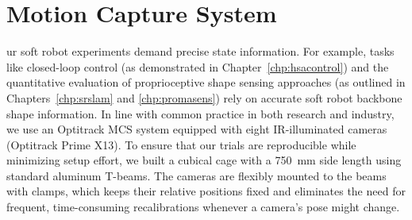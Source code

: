 \section{Motion Capture System}\label{sec:apx:infrastructure:motion_capture_system}
ur soft robot experiments demand precise state information. For example, tasks like closed-loop control (as demonstrated in Chapter~\ref{chp:hsacontrol}) and the quantitative evaluation of proprioceptive shape sensing approaches (as outlined in Chapters~\ref{chp:srslam} and \ref{chp:promasens}) rely on accurate soft robot backbone shape information. In line with common practice in both research and industry, we use an Optitrack \gls{MCS} system equipped with eight \gls{IR}-illuminated cameras (Optitrack Prime X13). To ensure that our trials are reproducible while minimizing setup effort, we built a cubical cage with a \SI{750}{mm} side length using standard aluminum T-beams. The cameras are flexibly mounted to the beams with clamps, which keeps their relative positions fixed and eliminates the need for frequent, time-consuming recalibrations whenever a camera’s pose might change.

